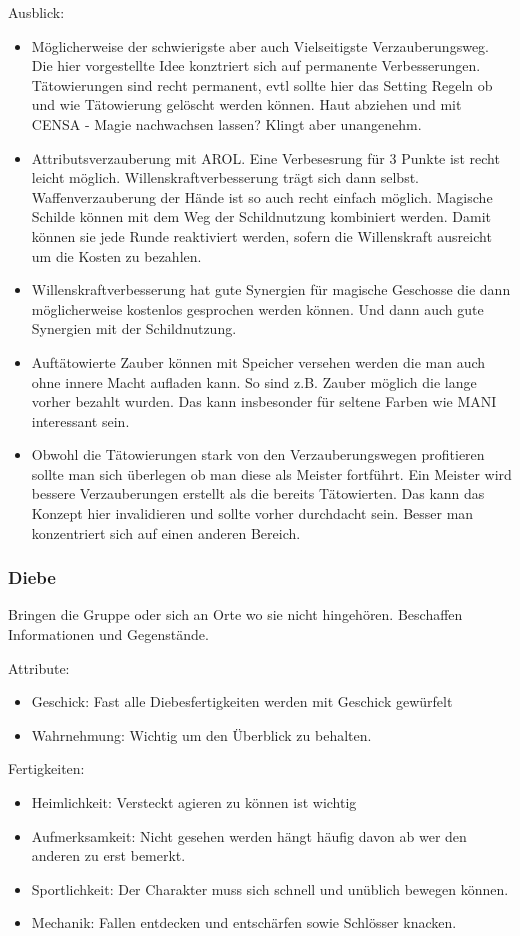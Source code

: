 \documentclass{article}
\begin{document}
Ausblick:
\begin{itemize}
\item Möglicherweise der schwierigste aber auch Vielseitigste Verzauberungsweg. Die hier vorgestellte Idee konztriert sich auf permanente Verbesserungen. Tätowierungen sind recht permanent, evtl sollte hier das Setting Regeln ob und wie Tätowierung gelöscht werden können. Haut abziehen und mit CENSA - Magie nachwachsen lassen? Klingt aber unangenehm.
\item Attributsverzauberung mit AROL. Eine Verbesesrung für 3 Punkte ist recht leicht möglich. Willenskraftverbesserung trägt sich dann selbst. Waffenverzauberung der Hände ist so auch recht einfach möglich. Magische Schilde können mit dem Weg der Schildnutzung kombiniert werden. Damit können sie jede Runde reaktiviert werden, sofern die Willenskraft ausreicht um die Kosten zu bezahlen.
\item Willenskraftverbesserung hat gute Synergien für magische Geschosse die dann möglicherweise kostenlos gesprochen werden können. Und dann auch gute Synergien mit der Schildnutzung.
\item Auftätowierte Zauber können mit Speicher versehen werden die man auch ohne innere Macht aufladen kann. So sind z.B. Zauber möglich die lange vorher bezahlt wurden. Das kann insbesonder für seltene Farben wie MANI interessant sein.
\item Obwohl die Tätowierungen stark von den Verzauberungswegen profitieren sollte man sich überlegen ob man diese als Meister fortführt. Ein Meister wird bessere Verzauberungen erstellt als die bereits Tätowierten. Das kann das Konzept hier invalidieren und sollte vorher durchdacht sein. Besser man konzentriert sich auf einen anderen Bereich.
\end{itemize}

\subsubsection{Diebe}
Bringen die Gruppe oder sich an Orte wo sie nicht hingehören. Beschaffen Informationen und Gegenstände.

Attribute:
\begin{itemize}
\item Geschick: Fast alle Diebesfertigkeiten werden mit Geschick gewürfelt
\item Wahrnehmung: Wichtig um den Überblick zu behalten.
\end{itemize}

Fertigkeiten:
\begin{itemize}
\item Heimlichkeit: Versteckt agieren zu können ist wichtig
\item Aufmerksamkeit: Nicht gesehen werden hängt häufig davon ab wer den anderen zu erst bemerkt.
\item Sportlichkeit: Der Charakter muss sich schnell und unüblich bewegen können.
\item Mechanik: Fallen entdecken und entschärfen sowie Schlösser knacken.
\end{itemize}
\end{document}
